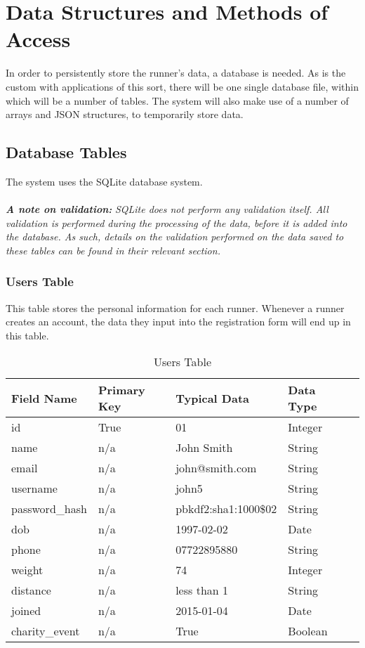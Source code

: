 \documentclass{article}[12pt,a4paper]
\begin{document}
\section{Data Structures and Methods of Access}
In order to persistently store the runner's data, a database is needed. As is the custom with applications of this sort, there will be one single database file, within which will be a number of tables. The system will also make use of a number of arrays and JSON structures, to temporarily store data.

\subsection{Database Tables}
The system uses the SQLite database system.
\\\\\textbf{\textit{A note on validation: }}\textit{SQLite does not perform any validation itself. All validation is performed during the processing of the data, before it is added into the database. As such, details on the validation performed on the data saved to these tables can be found in their relevant section.}


\subsubsection{Users Table}
This table stores the personal information for each runner. Whenever a runner creates an account, the data they input into the registration form will end up in this table.

\begin{table}[h]
\begin{tabular}{|l|l|l|l|l|}
\hline
Field Name     & Primary Key & Typical Data         & Data Type \\ \hline
id             & True        & 01                   & Integer   \\ \hline
name           & n/a         & John Smith           & String    \\ \hline
email          & n/a         & john@smith.com       & String    \\ \hline
username       & n/a         & john5                & String    \\ \hline
password\_hash & n/a         & pbkdf2:sha1:1000\$02 & String    \\ \hline
dob            & n/a         & 1997-02-02           & Date      \\ \hline
phone          & n/a         & 07722895880          & String    \\ \hline
weight         & n/a         & 74                   & Integer   \\ \hline
distance       & n/a         & less than 1          & String    \\ \hline
joined         & n/a         & 2015-01-04           & Date      \\ \hline
charity\_event & n/a         & True                 & Boolean   \\ \hline
\end{tabular}
\caption{Users Table}
\end{table}
\end{document}
